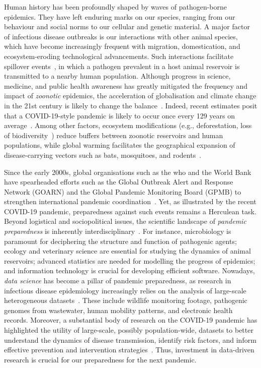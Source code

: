 Human history has been profoundly shaped by waves of pathogen-borne epidemics. They have left enduring marks on our species, ranging from our behaviour and social norms to our cellular and genetic material. A major factor of infectious disease outbreaks is our interactions with other animal species, which have become increasingly frequent with migration, domestication, and ecosystem-eroding technological advancements. Such interactions facilitate spillover events~\cite{vora2022, sikora2025}, in which a pathogen prevalent in a host animal reservoir is transmitted to a nearby human population. Although progress in science, medicine, and public health awareness has greatly mitigated the frequency and impact of \emph{zoonotic} epidemics, the acceleration of globalisation and climate change in the 21st century is likely to change the balance~\cite{carlson2022}. Indeed, recent estimates posit that a COVID-19-style pandemic is likely to occur once every 129 years on average~\cite{marani2021}. Among other factors, ecosystem modifications (e.g., deforestation, loss of biodiversity~\cite{ostfeld2009, keesing2010}) reduce buffers between zoonotic reservoirs and human populations, while global warming facilitates the geographical expansion of disease-carrying vectors such as bats, mosquitoes, and rodents~\cite{li2005, jones2008, ryan2019, johnson2020}. 

Since the early 2000s, global organisations such as the \gls{who} and the World Bank have spearheaded efforts such as the Global Outbreak Alert and Response Network (GOARN) and the Global Pandemic Monitoring Board (GPMB) to strengthen international pandemic coordination~\cite{heymann2001, knobler2004, who2025}. Yet, as illustrated by the recent COVID-19 pandemic, preparedness against such events remains a Herculean task. Beyond logistical and sociopolitical issues, the scientific landscape of \emph{pandemic preparedness} is inherently interdisciplinary~\cite{fefferman2023}. For instance, microbiology is paramount for deciphering the structure and function of pathogenic agents; ecology and veterinary science are essential for studying the dynamics of animal reservoirs; advanced statistics are needed for modelling the progress of epidemics; and information technology is crucial for developing efficient software. Nowadays, \emph{data science} has become a pillar of pandemic preparedness, as research in infectious disease epidemiology increasingly relies on the analysis of large-scale heterogeneous datasets~\cite{leonelli2021}. These include wildlife monitoring footage, pathogenic genomes from wastewater, human mobility patterns, and electronic health records. Moreover, a substantial body of research on the COVID-19 pandemic has highlighted the utility of large-scale, possibly population-wide, datasets to better understand the dynamics of disease transmission, identify risk factors, and inform effective prevention and intervention strategies~\cite{grenfell2004, robishaw2021, vigfusson2021, attwood2022, matteson2023, khurana2024}. Thus, investment in data-driven research is crucial for our preparedness for the next pandemic.

